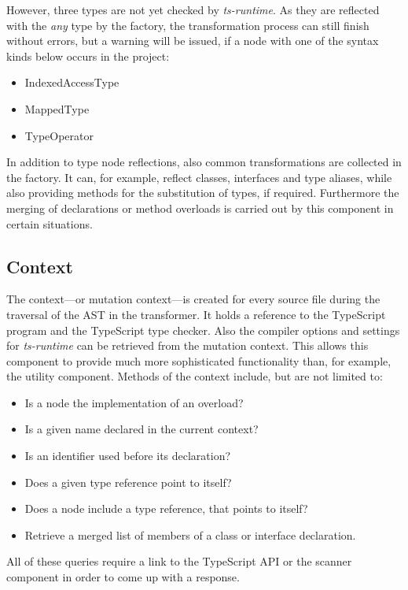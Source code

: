 However, three types are not yet checked by \emph{ts-runtime}. As they are reflected with the \emph{any} type by the factory, the transformation process can still finish without errors, but a warning will be issued, if a node with one of the syntax kinds below occurs in the project:
\begin{itemize}
  \item IndexedAccessType
  \item MappedType
  \item TypeOperator
\end{itemize}
In addition to type node reflections, also common transformations are collected in the factory. It can, for example, reflect classes, interfaces and type aliases, while also providing methods for the substitution of types, if required. Furthermore the merging of declarations or method overloads is carried out by this component in certain situations.

\subsection{Context}

The context---or mutation context---is created for every source file during the traversal of the AST in the transformer. It holds a reference to the TypeScript program and the TypeScript type checker. Also the compiler options and settings for \emph{ts-runtime} can be retrieved from the mutation context. This allows this component to provide much more sophisticated functionality than, for example, the utility component. Methods of the context include, but are not limited to:
\begin{itemize}
  \item Is a node the implementation of an overload?
  \item Is a given name declared in the current context?
  \item Is an identifier used before its declaration?
  \item Does a given type reference point to itself?
  \item Does a node include a type reference, that points to itself?
  \item Retrieve a merged list of members of a class or interface declaration.
\end{itemize}
All of these queries require a link to the TypeScript API or the scanner component in order to come up with a response. 

